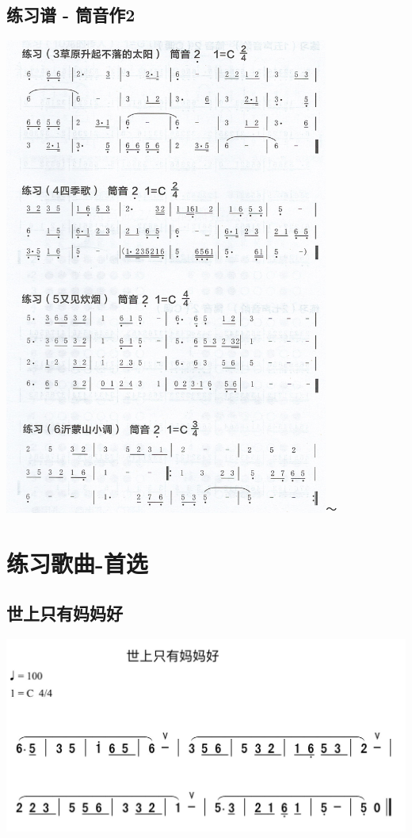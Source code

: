 \documentclass[cn,pad,chinesefont=nofont]{elegantbook}
\begin{document}
\section{练习谱 - 筒音作2}
	\includegraphics[width=0.8\textwidth]{dongxiao/Scan 6.jpeg}～

\chapter{练习歌曲-首选}
\section{世上只有妈妈好}
	\includegraphics[width=\textwidth]{dongxiao/IMG_0854-世上只有妈妈好.png}
\end{document}
